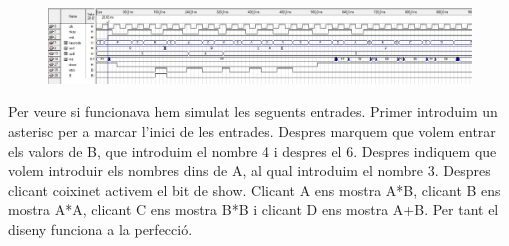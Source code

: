 \documentclass[12pt, a4papre]{article}
\begin{document}
	\begin{figure}[H]
		\begin{center}
		\includegraphics[width=130mm]{SimPpalExtra.jpeg}
		\end{center}
	\end{figure}
	
	Per veure si funcionava hem simulat les seguents entrades. Primer introduim un asterisc per a marcar l'inici de les entrades. Despres marquem que volem entrar els valors de B, que introduim el nombre 4 i despres el 6. Despres indiquem que volem introduir els nombres dins de A, al qual introduim el nombre 3. Despres clicant coixinet activem el bit de show. Clicant A ens mostra A*B, clicant B ens mostra A*A, clicant C ens mostra B*B i clicant D ens mostra A+B. Per tant el diseny funciona a la perfecció.
	
	


	
\end{document}

